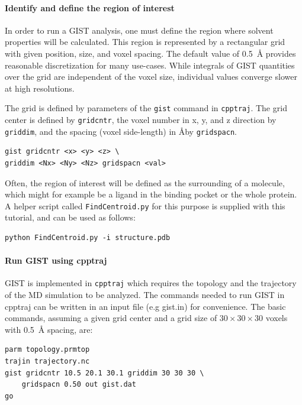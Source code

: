 \documentclass[9pt,tutorial]{livecoms}
\newcommand{\software}{\texttt}
\newcommand\inlinecode{\texttt}
\begin{document}
\paragraph{Identify and define the region of interest}
In order to run a GIST analysis, one must define the region where solvent properties will be calculated.
This region is represented by a rectangular grid with given position, size, and voxel spacing.
The default value of \SI{0.5}{\angstrom} provides reasonable discretization for many use-cases.
While integrals of GIST quantities over the grid are independent of the voxel size, individual values converge slower at high resolutions.

The grid is defined by parameters of the \inlinecode{gist} command in \software{cpptraj}.
The grid center is defined by \inlinecode{gridcntr}, the voxel number in x, y, and z direction by \inlinecode{griddim}, and the spacing (voxel side-length) in \AA by \inlinecode{gridspacn}.

\begin{lstlisting}[style=cpptraj]
gist gridcntr <x> <y> <z> \
griddim <Nx> <Ny> <Nz> gridspacn <val>
\end{lstlisting}

Often, the region of interest will be defined as the surrounding of a molecule, which might for example be a ligand in the binding pocket or the whole protein.
A helper script called \inlinecode{FindCentroid.py} for this purpose is supplied with this tutorial, and can be used as follows:

\begin{lstlisting}[style=bash]
python FindCentroid.py -i structure.pdb
\end{lstlisting}

\paragraph{Run GIST using cpptraj}
GIST is implemented in \software{cpptraj} which requires the topology and the trajectory of the MD simulation to be analyzed.
The commands needed to run GIST in cpptraj can be written in an input file (e.g gist.in) for convenience. The basic commands, assuming a given grid center and a grid size of $30\times30\times30$ voxels with \SI{0.5}{\angstrom} spacing, are:

\begin{lstlisting}[style=cpptraj]
parm topology.prmtop
trajin trajectory.nc
gist gridcntr 10.5 20.1 30.1 griddim 30 30 30 \
	gridspacn 0.50 out gist.dat
go
\end{lstlisting}
\end{document}
